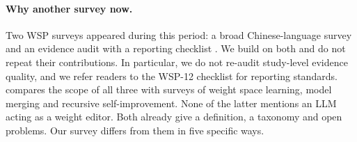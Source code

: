 \paragraph{Why another survey now.} Two WSP surveys appeared during this period: a broad Chinese-language survey \citep{emecii2026survey} and an evidence audit with a reporting checklist \citep{turkoglu2026survey}. We build on both and do not repeat their contributions. In particular, we do not re-audit study-level evidence quality, and we refer readers to the WSP-12 checklist \citep{turkoglu2026survey} for reporting standards.  compares the scope of all three with surveys of weight space learning, model merging and recursive self-improvement. None of the latter mentions an LLM acting as a weight editor. Both already give a definition, a taxonomy and open problems. Our survey differs from them in five specific ways.


